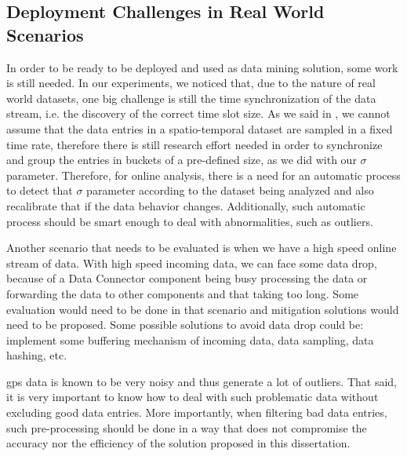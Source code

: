 \subsection{Deployment Challenges in Real World Scenarios}
In order to be ready to be deployed and used as data mining solution, some work is still needed. In our experiments, we
noticed that, due to the nature of real world datasets, one big challenge is still the time synchronization of the data
stream, i.e. the discovery of the correct time slot size. As we said in , we cannot assume
that the data entries in a spatio-temporal dataset are sampled in a fixed time rate, therefore there is still research effort needed in order  to
synchronize and group the entries in buckets of a pre-defined size, as we did with our $\sigma$ parameter. Therefore, for
online analysis, there is a need for an automatic process to detect that $\sigma$ parameter according to the dataset
being analyzed and also recalibrate that if the data behavior changes. Additionally, such automatic process should be
smart enough to deal with abnormalities, such as outliers.

Another scenario that needs to be evaluated is when we have a high speed online stream of data. With high speed incoming
data, we can face some data drop, because of a Data Connector component being busy processing the data or forwarding the
data to other components and that taking too long. Some evaluation would need to be done in that scenario and mitigation
solutions would need to be proposed. Some possible solutions to avoid data drop could be: implement some buffering
mechanism of incoming data, data sampling, data hashing, etc.

\ac{gps} data is known to be very noisy and thus generate a lot of outliers. That said, it is very important to know how
to deal with such problematic data without excluding good data entries. More importantly, when filtering bad data
entries, such pre-processing should be done in a way that does not compromise the accuracy nor the efficiency of the
solution proposed in this dissertation.
